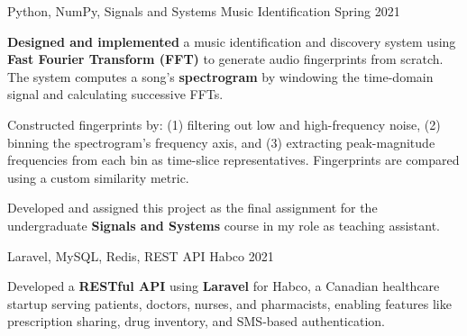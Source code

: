 \begin{cventries}
  \cventry
    {Python, NumPy, Signals and Systems} %
    {Music Identification} %
    {} %
    {Spring 2021} %
    {
      \begin{cvitems} %
      	\item {\textbf{Designed and implemented} a music identification and discovery system using \textbf{Fast Fourier Transform (FFT)} to generate audio fingerprints from scratch. The system computes a song's \textbf{spectrogram} by windowing the time-domain signal and calculating successive FFTs.}
        \item {Constructed fingerprints by: (1) filtering out low and high-frequency noise, (2) binning the spectrogram's frequency axis, and (3) extracting peak-magnitude frequencies from each bin as time-slice representatives. Fingerprints are compared using a custom similarity metric.}
        \item {Developed and assigned this project as the final assignment for the undergraduate \textbf{Signals and Systems} course in my role as teaching assistant.}
      \end{cvitems}
    }

    
  \cventry
    {Laravel, MySQL, Redis, REST API} %
    {Habco} %
    {} %
    {2021} %
    {
      \begin{cvitems} %
      	\item {Developed a \textbf{RESTful API} using \textbf{Laravel} for Habco, a Canadian healthcare startup serving patients, doctors, nurses, and pharmacists, enabling features like prescription sharing, drug inventory, and SMS-based authentication.}
      \end{cvitems}
    }


\end{cventries}
